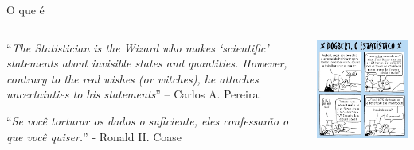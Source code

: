 \documentclass{beamer}
\begin{document}
\begin{frame}{\scriptsize O que é}
  \begin{columns}
    \begin{column}{7cm}
      \begin{block}{}
        {\scriptsize ``{\em The Statistician is the Wizard who makes
            `scientific' statements about invisible states and
            quantities. However, contrary to the real wishes (or
            witches), he attaches uncertainties to his statements}'' –
          Carlos A.  Pereira.}
      \end{block}
      \begin{block}{}
        {\scriptsize ``{\em Se você torturar os dados o suficiente,
            eles confessarão o que você quiser.}'' - Ronald H. Coase}
      \end{block}

    \end{column}
    \begin{column}{3cm}
      \begin{center}
        \includegraphics[width=1.6\textwidth]{Cap1/dilbert}
      \end{center}
    \end{column}
  \end{columns}
\end{frame}
\end{document}
